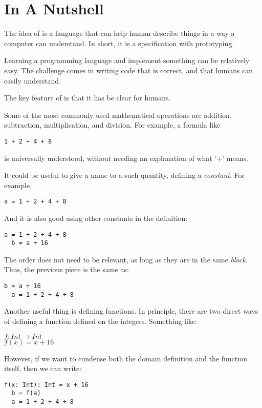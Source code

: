 \section{In A Nutshell}

The idea of \Soda is a language that can help human describe things in a way a computer can understand.
In short, it is a specification with prototyping.

Learning a programming language and implement something can be relatively easy.
The challenge comes in writing code that is correct, and that humans can easily understand.

The key feature of \Soda is that it has be clear for humans.

Some of the most commonly used mathematical operations are addition, subtraction, multiplication, and division.
For example, a formula like
\begin{lstlisting}[label={lst:exampleAddition}]
  1 + 2 + 4 + 8
\end{lstlisting}
is universally understood, without needing an explanation of what '+' means.

It could be useful to give a name to a such quantity, defining a \emph{constant}.
For example,
\begin{lstlisting}[label={lst:exampleBindingToConstant}]
  a = 1 + 2 + 4 + 8
\end{lstlisting}

And it is also good using other constants in the definition:
\begin{lstlisting}[label={lst:exampleBindingToMultipleConstants}]
  a = 1 + 2 + 4 + 8
  b = a + 16
\end{lstlisting}

The order does not need to be relevant, as long as they are in the same \emph{block}.
Thus, the previous piece is the same as:
\begin{lstlisting}[label={lst:exampleBindingToMultipleConstantsDifferentOder}]
  b = a + 16
  a = 1 + 2 + 4 + 8
\end{lstlisting}

Another useful thing is defining functions.
In principle, there are two direct ways of defining a function defined on the integers.
Something like:
\begin{center}
    $f: Int \to Int$ \\
    $f(x) = x + 16$
\end{center}

However, if we want to condense both the domain definition and the function itself, then we can write:
\begin{lstlisting}[label={lst:exampleFunctionDefinition}]
  f(x: Int): Int = x + 16
  b = f(a)
  a = 1 + 2 + 4 + 8
\end{lstlisting}

